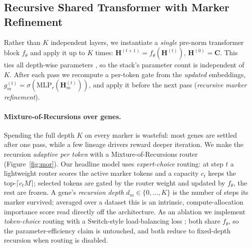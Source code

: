 \documentclass[letterpaper]{article}
\begin{document}
\subsection{Recursive Shared Transformer with Marker Refinement}
\label{sec:rec}
Rather than $K$ independent layers, we instantiate a \emph{single} pre-norm
transformer block $f_\theta$ and apply it up to $K$ times:
$\mathbf{H}^{(t+1)} = f_\theta(\mathbf{H}^{(t)})$, $\mathbf{H}^{(0)} = \mathbf{C}$.
This ties all depth-wise parameters \cite{dehghani2019universal,lan2020albert,%
bae2025mixture}, so the stack's parameter count is independent of $K$. After each
pass we recompute a per-token gate from the \emph{updated} embeddings,
$g^{(t)}_m = \sigma(\mathrm{MLP}_r(\mathbf{H}^{(t)}_m))$, and apply it before the next
pass (\emph{recursive marker refinement}).

\paragraph{Mixture-of-Recursions over genes.}
Spending the full depth $K$ on every marker is wasteful: most genes are settled after
one pass, while a few lineage drivers reward deeper iteration. We make the recursion
\emph{adaptive per token} with a Mixture-of-Recursions router \cite{bae2025mixture}
(Figure~\ref{fig:mor}). Our headline model uses \emph{expert-choice} routing: at step
$t$ a lightweight router scores the active marker tokens and a capacity $c_t$ keeps
the top-$\lceil c_t M\rceil$; selected tokens are gated by the router weight and
updated by $f_\theta$, the rest are frozen. A gene's \emph{recursion depth}
$d_m\in\{0,\dots,K\}$ is the number of steps its marker survived; averaged over a
dataset this is an intrinsic, compute-allocation importance score read directly off
the architecture. As an ablation we implement \emph{token-choice} routing
\cite{bae2025mixture} with a Switch-style load-balancing loss
\cite{shazeer2017outrageously}; both share $f_\theta$, so the parameter-efficiency
claim is untouched, and both reduce to fixed-depth recursion when routing is disabled.
\end{document}
